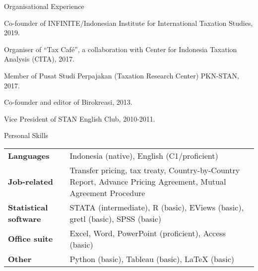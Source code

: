 \documentclass{resume}
\begin{document}
\begin{rSection}{Organisational Experience} 
\item Co-founder of INFINITE/Indonesian Institute for International Taxation Studies, 2019.
\item Organiser of “Tax Café”, a collaboration with Center for Indonesia Taxation Analysis (CITA), 2017.
\item Member of Pusat Studi Perpajakan (Taxation Research Center) PKN-STAN, 2017.
\item Co-founder and editor of Birokreasi, 2013.
\item Vice President of STAN English Club, 2010-2011.
\end{rSection}

\begin{rSection}{Personal Skills}

\begin{tabular}{p{4cm}p{12.6cm}}
\textbf{Languages} & Indonesia (native), English (C1/proficient) \\
\textbf{Job-related} & Transfer pricing, tax treaty, Country-by-Country Report, Advance Pricing Agreement, Mutual Agreement Procedure\\
\textbf{Statistical software} & STATA (intermediate), R (basic), EViews (basic), gretl (basic), SPSS (basic) \\
\textbf{Office suite} & Excel, Word, PowerPoint (proficient), Access (basic)\\
\textbf{Other} & Python (basic), Tableau (basic), {\LaTeX} (basic)\\

\end{tabular}

\end{rSection}
\end{document}

